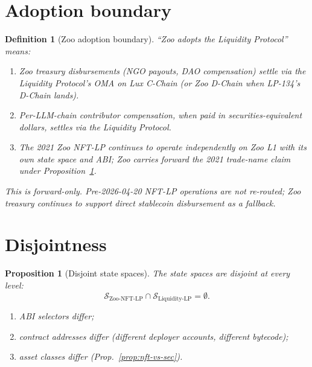 \documentclass[11pt]{article}
\newtheorem{definition}{Definition}
\newtheorem{proposition}[theorem]{Proposition}
\begin{document}
\section{Adoption boundary}
\label{sec:adopt}

\begin{definition}[Zoo adoption boundary]
\label{def:adopt}
``Zoo adopts the Liquidity Protocol'' means:
\begin{enumerate}[nosep]
  \item Zoo treasury disbursements (NGO payouts, DAO compensation)
        settle via the Liquidity Protocol's OMA on Lux C-Chain (or
        Zoo D-Chain when LP-134's D-Chain lands).
  \item Per-LLM-chain contributor compensation, when paid in
        securities-equivalent dollars, settles via the Liquidity
        Protocol.
  \item The 2021 Zoo NFT-LP continues to operate independently on
        Zoo L1 with its own state space and ABI; Zoo carries forward
        the 2021 trade-name claim under
        Proposition~\ref{prop:disjoint}.
\end{enumerate}
This is forward-only.  Pre-2026-04-20 NFT-LP operations are not
re-routed; Zoo treasury continues to support direct stablecoin
disbursement as a fallback.
\end{definition}

\section{Disjointness}
\label{sec:disjoint}

\begin{proposition}[Disjoint state spaces]
\label{prop:disjoint}
The state spaces are disjoint at every level:
\[
  \mathcal{S}_{\mathrm{Zoo\text{-}NFT\text{-}LP}} \cap
  \mathcal{S}_{\mathrm{Liquidity\text{-}LP}} = \emptyset.
\]
\begin{enumerate}[nosep]
  \item ABI selectors differ;
  \item contract addresses differ (different deployer accounts,
        different bytecode);
  \item asset classes differ
        (Prop.~\ref{prop:nft-vs-sec}).
\end{enumerate}
\end{proposition}
\end{document}
